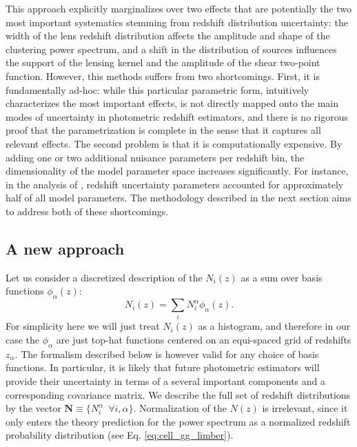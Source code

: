\documentclass[a4paper,11pt]{article}
\newcommand{\as}[1]{{\textcolor{blue}{[AS: #1]}}}
\newcommand{\da}[1]{{\textcolor{red}{[DA: #1]}}}
\newcommand{\vN}{\mathbf{N}}
\begin{document}
      This approach explicitly marginalizes over two effects that are potentially the two most important systematics stemming from redshift distribution uncertainty: the width of the lens redshift distribution affects the amplitude and shape of the clustering power spectrum, and a shift in the distribution of sources influences the support of the lensing kernel and the amplitude of the shear two-point function. However, this methods suffers from two shortcomings. First, it is fundamentally ad-hoc: while this particular parametric form, intuitively characterizes the most important effects, is not directly mapped onto the main modes of uncertainty in photometric redshift estimators, and there is no rigorous proof that the parametrization is complete in the sense that it captures all relevant effects. The second problem is that it is computationally expensive. By adding one or two additional nuisance parameters per redshift bin, the dimensionality of the model parameter space increases significantly. For instance, in the analysis of \cite{1912.08209}, redshift uncertainty parameters accounted for approximately half of all model parameters. The methodology described in the next section aims to address both of these shortcomings.

    \subsection{A new approach}\label{ssec:theory.nz_new}
      Let us consider a discretized description of the $N_i(z)$ as a sum over basis functions $\phi_\alpha(z)$:
      \begin{equation}
        N_i(z)=\sum_i N^\alpha_i\phi_\alpha(z).
      \end{equation}
      For simplicity here we will just treat $N_i(z)$ as a histogram, and therefore in our case the $\phi_\alpha$ are just top-hat functions centered on an equi-spaced grid of redshifts $z_\alpha$. The formalism described below is however valid for any choice of basis functions. In particular, it is likely that future photometric estimators will provide their uncertainty in terms of a several important components and a corresponding covariance matrix.    We describe the full set of redshift distributions by the vector $\vN\equiv\{N^\alpha_i\,\,\,\forall i,\alpha\}$.  Normalization of the $N(z)$ is irrelevant, since it only enters the theory prediction for the power spectrum as a normalized redshift probability distribution (see Eq. \ref{eq:cell_gg_limber}).
\end{document}
